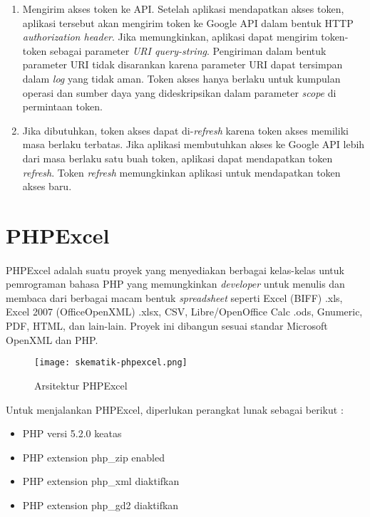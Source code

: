 \begin{enumerate}
\begin{figure} [H]
\end{figure}
  	\item Mengirim akses token ke API. Setelah aplikasi mendapatkan akses token, aplikasi tersebut akan mengirim token ke Google API dalam bentuk HTTP \textit{authorization header}. Jika memungkinkan, aplikasi dapat mengirim token-token sebagai parameter \textit{URI query-string}. Pengiriman dalam bentuk parameter URI tidak disarankan karena parameter URI dapat tersimpan dalam \textit{log} yang tidak aman. Token akses hanya berlaku untuk kumpulan operasi dan sumber daya yang dideskripsikan dalam parameter \textit{scope} di permintaan token. 
	\item Jika dibutuhkan, token akses dapat di-\textit{refresh} karena token akses memiliki masa berlaku terbatas. Jika aplikasi membutuhkan akses ke Google API lebih dari masa berlaku satu buah token, aplikasi dapat mendapatkan token \textit{refresh}. Token \textit{refresh} memungkinkan aplikasi untuk mendapatkan token akses baru.
  
\end{enumerate}

\section{PHPExcel} 
\label{phpexcel}

\paragraph{} PHPExcel adalah suatu proyek yang menyediakan berbagai kelas-kelas untuk pemrograman bahasa PHP yang memungkinkan \textit{developer} untuk menulis dan membaca dari berbagai macam bentuk \textit{spreadsheet} seperti Excel (BIFF) .xls, Excel 2007 (OfficeOpenXML) .xlsx, CSV, Libre/OpenOffice Calc .ods, Gnumeric, PDF, HTML, dan lain-lain. Proyek ini dibangun sesuai standar Microsoft OpenXML dan PHP.\cite{phpexcel:14} 

\begin{figure} [H]
	\centering  
	\texttt{[image: skematik-phpexcel.png]}  
	\caption[Arsitektur PHPExcel]{Arsitektur PHPExcel} 
	\label{fig:skematik-phpexcel} 
\end{figure}

Untuk menjalankan PHPExcel, diperlukan perangkat lunak sebagai berikut :
\begin{itemize}
	\item  PHP versi 5.2.0 keatas
	\item  PHP extension php\_zip enabled
	\item  PHP extension php\_xml diaktifkan
	\item  PHP extension php\_gd2 diaktifkan 
\end{itemize}


